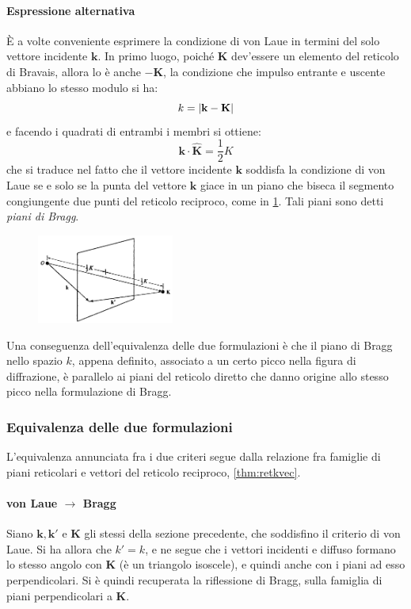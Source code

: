 \paragraph{Espressione alternativa} \`E a volte conveniente esprimere la condizione di von Laue in termini del solo vettore incidente $ \textbf{k} $.
In primo luogo, poiché $ \textbf{K} $ dev'essere un elemento del reticolo di Bravais, allora lo è anche $ -\textbf{K} $, la condizione che impulso entrante e uscente abbiano lo stesso modulo si ha:
\[ k=\abs{\textbf{k} - \textbf{K}} \]
e facendo i quadrati di entrambi i membri si ottiene:
\[ \textbf{k}\cdot\hat{\textbf{K}} = \frac{1}{2} K \]
che si traduce nel fatto che il vettore incidente $ \textbf{k} $ soddisfa la condizione di von Laue se e solo se la punta del vettore $ \textbf{k} $ giace in un piano che biseca il segmento congiungente due punti del reticolo reciproco, come in \cref{fig:laueB}. Tali piani sono detti \textit{piani di Bragg}.

\begin{figure}[h]
	\centering
	\includegraphics[width=0.4\textwidth]{Immagini/vonLaueB.png}
	\vspace{-5pt}
	\caption{}
	\label{fig:laueB}
	\vspace{-5pt}
\end{figure}

Una conseguenza dell'equivalenza delle due formulazioni è che il piano di Bragg nello spazio $ k $, appena definito, associato a un certo picco nella figura di diffrazione, è parallelo ai piani del reticolo diretto che danno origine allo stesso picco nella formulazione di Bragg.

\subsubsection{Equivalenza delle due formulazioni}

L'equivalenza annunciata fra i due criteri segue dalla relazione fra famiglie di piani reticolari e vettori del reticolo reciproco, \cref{thm:retkvec}.

\paragraph{von Laue $ \rightarrow $ Bragg} Siano $ \textbf{k}, \textbf{k}' $ e $ \textbf{K} $ gli stessi della sezione precedente, che soddisfino il criterio di von Laue. Si ha allora che $ k' = k $, e ne segue che i vettori incidenti e diffuso formano lo stesso angolo con $ \textbf{K} $ (è un triangolo isoscele), e quindi anche con i piani ad esso perpendicolari. Si è quindi recuperata la riflessione di Bragg, sulla famiglia di piani perpendicolari a $ \textbf{K} $.

